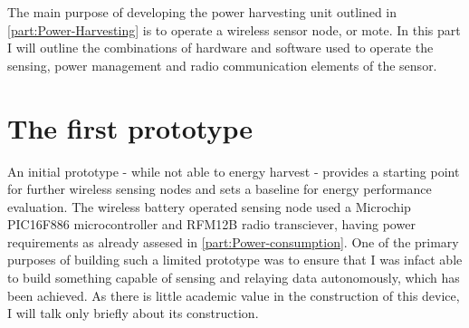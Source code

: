 
The main purpose of developing the power harvesting unit outlined
in \ref{part:Power-Harvesting} is to operate a wireless sensor node,
or mote. In this part I will outline the combinations of hardware
and software used to operate the sensing, power management and radio
communication elements of the sensor.


\section{The first prototype}

An initial prototype - while not able to energy harvest - provides
a starting point for further wireless sensing nodes and sets a baseline
for energy performance evaluation. The wireless battery operated sensing
node used a Microchip PIC16F886 microcontroller and RFM12B radio transciever,
having power requirements as already assesed in \ref{part:Power-consumption}.
One of the primary purposes of building such a limited prototype was
to ensure that I was infact able to build something capable of sensing
and relaying data autonomously, which has been achieved. As there
is little academic value in the construction of this device, I will
talk only briefly about its construction.

